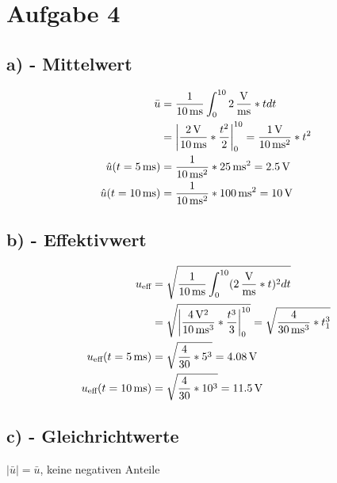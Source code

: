 \documentclass[../../document.tex]{subfiles}
\begin{document}
\section*{Aufgabe 4}

\subsection*{a) - Mittelwert}

\begin{equation*}
    \begin{split}
       \bar{u} &= \frac{1}{\SI{10}{\milli\second}} \int_{0}^{10} \SI{2}{\frac{\volt}{\milli\second}} * t dt\\ 
       &= \left\lvert \frac{\SI{2}{\volt}}{\SI{10}{\milli\second}} * \frac{t^2}{2} \right\rvert_{0}^{10} = \frac{\SI{1}{\volt}}{\SI{10}{\milli\second^2}} * t^2\\
       \hat{u} (t = \SI{5}{\milli\second}) &= \frac{1}{\SI{10}{\milli\second^2}} * \SI{25}{\milli\second^2} = \SI{2,5}{\volt}\\
       \hat{u} (t = \SI{10}{\milli\second}) &= \frac{1}{\SI{10}{\milli\second^2}} * \SI{100}{\milli\second^2} = \SI{10}{\volt}\\
    \end{split}
\end{equation*}

\subsection*{b) - Effektivwert}

\begin{equation*}
    \begin{split}
        u_{\textrm{eff}} &= \sqrt{\frac{1}{\SI{10}{\milli\second}} \int_{0}^{10} ( \SI{2}{\frac{\volt}{\milli\second}} * t )^2 dt}\\
        &= \sqrt{\left\lvert \frac{\SI{4}{\volt^2}}{\SI{10}{\milli\second^3}} * \frac{t^3}{3} \right\rvert_0^{10} } = \sqrt{\frac{4}{\SI{30}{\milli\second^3}} * t_{\textrm{1}}^3 }\\
        u_{\textrm{eff}} (t = \SI{5}{\milli\second}) &= \sqrt{\frac{4}{30} * 5^3} = \SI{4,08}{\volt}\\
        u_{\textrm{eff}} (t = \SI{10}{\milli\second}) &= \sqrt{\frac{4}{30} * 10^3} = \SI{11,5}{\volt}\\
    \end{split}
\end{equation*}

\subsection*{c) - Gleichrichtwerte}

\( \left\lvert \bar{u} \right\rvert = \bar{u} \), keine negativen Anteile
\end{document}
